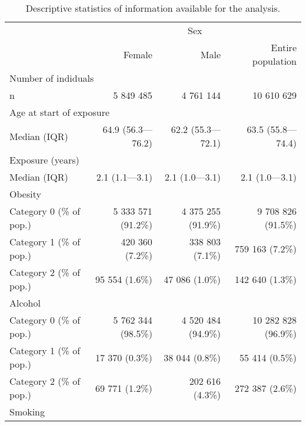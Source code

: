 \documentclass[risks,article,submit,moreauthors,pdftex]{Definitions/mdpi}
\begin{document}
\begin{table}\begin{longtable}{l|rrr}
\caption{
\label{tab:demo_stats}Descriptive statistics of information
        available for the analysis.
} \\ 
\toprule
\multicolumn{1}{l}{} & \multicolumn{3}{c}{Sex} \\ 
\cmidrule(lr){2-4}
\multicolumn{1}{l}{} & Female & Male & Entire population \\ 
\midrule
\multicolumn{4}{l}{Number of indiduals} \\ 
\midrule
\hspace*{25px} n & 5 849 485 & 4 761 144 & 10 610 629 \\ 
\midrule
\multicolumn{4}{l}{Age at start of exposure} \\ 
\midrule
\hspace*{25px} Median (IQR) & 64.9 (56.3—76.2) & 62.2 (55.3—72.1) & 63.5 (55.8—74.4) \\ 
\midrule
\multicolumn{4}{l}{Exposure (years)} \\ 
\midrule
\hspace*{25px} Median (IQR) & 2.1 (1.1—3.1) & 2.1 (1.0—3.1) & 2.1 (1.0—3.1) \\ 
\midrule
\multicolumn{4}{l}{Obesity} \\ 
\midrule
\hspace*{25px} Category  0 (\% of pop.) & 5 333 571 (91.2\%) & 4 375 255 (91.9\%) & 9 708 826 (91.5\%) \\ 
\hspace*{25px} Category  1 (\% of pop.) & 420 360 (7.2\%) & 338 803 (7.1\%) & 759 163 (7.2\%) \\ 
\hspace*{25px} Category  2 (\% of pop.) & 95 554 (1.6\%) & 47 086 (1.0\%) & 142 640 (1.3\%) \\ 
\midrule
\multicolumn{4}{l}{Alcohol} \\ 
\midrule
\hspace*{25px} Category  0 (\% of pop.) & 5 762 344 (98.5\%) & 4 520 484 (94.9\%) & 10 282 828 (96.9\%) \\ 
\hspace*{25px} Category  1 (\% of pop.) & 17 370 (0.3\%) & 38 044 (0.8\%) & 55 414 (0.5\%) \\ 
\hspace*{25px} Category  2 (\% of pop.) & 69 771 (1.2\%) & 202 616 (4.3\%) & 272 387 (2.6\%) \\ 
\midrule
\multicolumn{4}{l}{Smoking} \\ 

\end{longtable}
\end{table}
\end{document}
